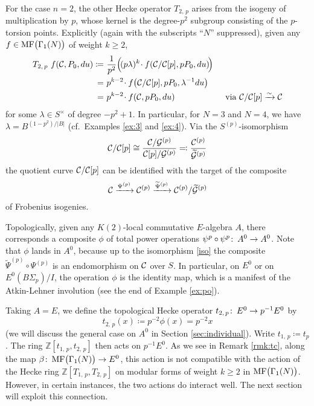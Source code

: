 \documentclass{gtpart}
\theoremstyle{definition}
\theoremstyle{remark}
\def\co{\colon\thinspace}
\newcommand{\mb}[1]{\mathbb{#1}}
\newcommand{\CC}{{\cal C}}
\newcommand{\CG}{{\cal G}}
\newcommand{\BZ}{{\mb Z}}
\newcommand{\MF}{{\rm MF}}
\newcommand{\B}{\beta}
\newcommand{\f}{\phi}
\newcommand{\G}{\Gamma}
\renewcommand{\l}{\lambda}
\newcommand{\ce}{\coloneqq}
\renewcommand{\=}{\approx}
\renewcommand{\-}{\sim}
\numberwithin{equation}{section}
\numberwithin{thm}{section}
\begin{document}
For the case $n = 2$, the other Hecke operator $T_{2,\,p}$ arises from the isogeny of multiplication by $p$, whose kernel is the degree-$p^2$ subgroup consisting of the $p$-torsion points.  
Explicitly (again with the subscripts ``$N$'' suppressed), given any $f \in \MF\big(\G_1(N)\big)$ of weight $k \geq 2$, 
\begin{equation}
 \label{T2p}
 \begin{split}
  T_{2,\,p}~f(\CC, P_0, du) \ce & ~ \frac{1}{p^2} \Big(\! (p \l)^k \!\cdot f\!\left(\CC/\CC[p], p P_0, du\right) \!\!\Big) \\
                              = & ~ p^{k - 2} \!\cdot f\!\left(\CC/\CC[p], p P_0, \l^{-1} du\right) \\
                              = & ~ p^{k - 2} \!\cdot f(\CC, p P_0, du) \qquad\qquad\qquad \text{via $\CC/\CC[p] \xrightarrow{\sim} \CC$} 
 \end{split}
\end{equation}
for some $\l \in S^\times$ of degree $-p^2 + 1$.  
In particular, for $N = 3$ and $N = 4$, we have $\lambda = B^{(1 - p^2)/|B|}$ (cf.~Examples \ref{ex:3} and \ref{ex:4}).  
Via the $S^{(p)}$-isomorphism 
\begin{equation}
 \label{iso}
 \CC/\CC[p] \cong \frac{\CC/\CG^{(p)}}{\CC[p]/\CG^{(p)}} \eqqcolon \frac{\CC^{(p)}}{\widetilde{\CG}^{(p)}} 
\end{equation}
the quotient curve $\CC/\CC[p]$ can be identified with the target of the composite 
\[
 \CC \xrightarrow{\Psi^{(p)}} \CC^{(p)} \xrightarrow{\widetilde{\Psi}^{(p)}} \CC^{(p)}/\widetilde{\CG}^{(p)} 
\]
of Frobenius isogenies.  

Topologically, given any $K(2)$-local commutative $E$-algebra $A$, 
there corresponds a composite $\f$ of total power operations $\psi^p \circ \psi^p \co A^0 \to A^0$.  
Note that $\phi$ lands in $A^0$, 
because up to the isomorphism \eqref{iso} the composite $\widetilde{\Psi}^{(p)} \circ \Psi^{(p)}$ is an endomorphism on $\CC$ over $S$.  
In particular, on $E^0$ or on $E^0(B\Sigma_p) / I$, the operation 
$\phi$ is the identity map, which is a manifest of the Atkin-Lehner involution (see the end of Example \ref{ex:po}).  

Taking $A = E$, we define the topological Hecke operator $t_{2,\,p} \co E^0 \to p^{-1} E^0$ by 
\begin{equation}
 \label{t2p}
 t_{2,\,p}(x) \ce p^{-2} \phi(x) = p^{-2} x 
\end{equation}
(we will discuss the general case on $A^0$ in Section \ref{sec:individual}).  
Write $t_{1,\,p} \ce t_p$.  
The ring $\BZ[t_{1,\,p},t_{2,\,p}]$ then acts on $p^{-1} E^0$.  
As we see in Remark \ref{rmk:tc}, along the map $\B \co \MF\big(\G_1(N)\big) \to E^0$, 
this action is not compatible with the action of the Hecke ring $\BZ[T_{1,\,p},T_{2,\,p}]$ on modular forms of weight $k \geq 2$ in $\MF\big(\G_1(N)\big)$.  
However, in certain instances, the two actions do interact well.  
The next section will exploit this connection.  
\end{document}
